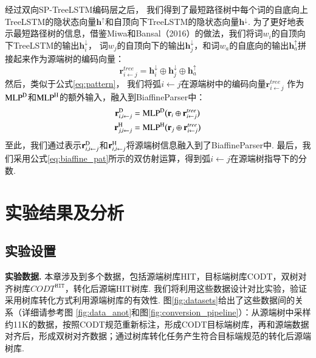 经过双向SP-TreeLSTM编码层之后，
我们得到了最短路径树中每个词的自底向上TreeLSTM的隐状态向量$\mathbf{h}^{\uparrow}$和自顶向下TreeLSTM的隐状态向量$\mathbf{h}^{\downarrow}$.
为了更好地表示最短路径树的信息，借鉴Miwa和Bansal（2016）\cite{miwa-p16-treelstm-re}的做法，我们将词$w_i$的自顶向下TreeLSTM的输出$\mathbf{h}_i^{\downarrow}$，
词$w_j$的自顶向下的输出$\mathbf{h}_j^{\downarrow}$，和词$w_a$的自底向的输出$\mathbf{h}_a^{\uparrow}$拼接起来作为源端树的编码向量：
\begin{equation}
    \label{eq:sp_treelstm_rep}
    \mathbf{r}^{tree}_{i \leftarrow j} = \mathbf{h}_i^{\downarrow} \oplus \mathbf{h}_j^{\downarrow} \oplus \mathbf{h}_a^{\uparrow}
\end{equation}
然后，类似于公式\ref{eq:pattern}，
我们将弧$i \leftarrow j$在源端树中的编码向量$\mathbf{r}^{tree}_{i \leftarrow j}$
作为$\textup{MLP}^{\textup{D}}$和$\textup{MLP}^{\textup{H}}$的额外输入，融入到BiaffineParser中：
\begin{equation}\label{eq:mlp_treelstm}
    \begin{split}
        \mathbf{r}_{i,i \leftarrow j}^{\textup{D}} &={\textup{MLP}}^{\textup{D}} \big(\mathbf{r}_i \oplus \mathbf{r}^{tree}_{i  \leftarrow j} \big)  \\
        \mathbf{r}_{j,i\leftarrow j}^{\textup{H}} &= {\textup{MLP}}^{\textup{H}} \big(\mathbf{r}_j \oplus \mathbf{r}^{tree}_{i \leftarrow j} \big)
    \end{split}
\end{equation}
至此，我们通过表示$\mathbf{r}_{i,i \leftarrow j}^{\textup{D}}$和$\mathbf{r}_{i,i \leftarrow j}^{\textup{H}}$将源端树信息融入到了BiaffineParser中.
最后，我们采用公式\ref{eq:biaffine_pat}所示的双仿射运算，得到弧$i \leftarrow j$在源端树指导下的分数.

\section{实验结果及分析}

\subsection{实验设置}
\textbf{实验数据.  }
本章涉及到多个数据，包括源端树库HIT，目标端树库CODT，双树对齐树库$CODT^{\texttt{HIT}}$，转化后源端HIT树库. 我们将利用这些数据设计对比实验，验证采用树库转化方式利用源端树库的有效性.
图\ref{fig:datasets}给出了这些数据间的关系（详细请参考图
\ref{fig:data_anot}和图\ref{fig:conversion_pipeline}）：从源端树中采样约11K的数据，按照CODT规范重新标注，形成CODT目标端树库，再和源端数据对齐后，形成双树对齐数据；通过树库转化任务产生符合目标端规范的转化后源端树库.

